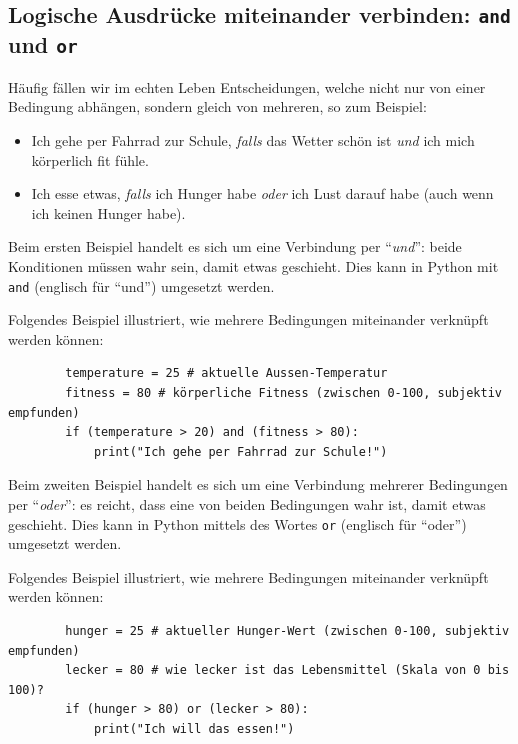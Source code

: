 \subsection{Logische Ausdrücke miteinander verbinden: \texorpdfstring{\lstinline|and|}{and} und \texorpdfstring{\lstinline|or|}{or}}



Häufig fällen wir im echten Leben Entscheidungen, welche nicht nur von einer Bedingung abhängen, sondern gleich von mehreren, so zum Beispiel:
\begin{itemize}
	\item Ich gehe per Fahrrad zur Schule, \textit{falls} das Wetter schön ist \textit{und} ich mich körperlich fit fühle.
	\item Ich esse etwas, \textit{falls} ich Hunger habe \textit{oder} ich Lust darauf habe (auch wenn ich keinen Hunger habe).
\end{itemize}
Beim ersten Beispiel handelt es sich um eine Verbindung per \enquote{\textit{und}}: beide Konditionen müssen wahr sein, damit etwas geschieht. Dies kann in Python mit \lstinline|and| (englisch für \enquote{und}) umgesetzt werden.

\begin{myexample}\label{example:fahrrad}
Folgendes Beispiel illustriert, wie mehrere Bedingungen miteinander verknüpft werden können:
\begin{lstlisting}
		temperature = 25 # aktuelle Aussen-Temperatur
		fitness = 80 # körperliche Fitness (zwischen 0-100, subjektiv empfunden)
		if (temperature > 20) and (fitness > 80):
			print("Ich gehe per Fahrrad zur Schule!")
	\end{lstlisting}
\end{myexample}

Beim zweiten Beispiel handelt es sich um eine Verbindung mehrerer Bedingungen per \enquote{\textit{oder}}: es reicht, dass eine von beiden Bedingungen wahr ist, damit etwas geschieht. Dies kann in Python mittels des Wortes \lstinline|or| (englisch für \enquote{oder}) umgesetzt werden.
\begin{myexample}
Folgendes Beispiel illustriert, wie mehrere Bedingungen miteinander verknüpft werden können:
\begin{lstlisting}
		hunger = 25 # aktueller Hunger-Wert (zwischen 0-100, subjektiv empfunden)
		lecker = 80 # wie lecker ist das Lebensmittel (Skala von 0 bis 100)?
		if (hunger > 80) or (lecker > 80):
			print("Ich will das essen!")
	\end{lstlisting}
\end{myexample}

